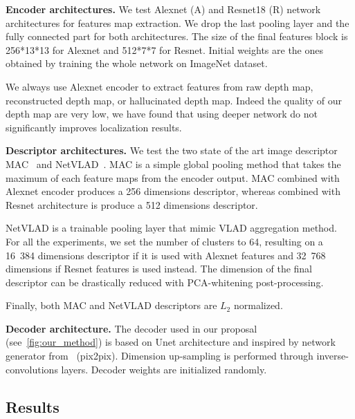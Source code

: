 \noindent\textbf{Encoder architectures.} We test Alexnet (A) and Resnet18 (R) network architectures for features map extraction. We drop the last pooling layer and the fully connected part for both architectures. The size of the final features block is 256*13*13 for Alexnet and 512*7*7 for Resnet. Initial weights are the ones obtained by training the whole network on ImageNet dataset.

We always use Alexnet encoder to extract features from raw depth map, reconstructed depth map, or hallucinated depth map. Indeed the quality of our depth map are very low, we have found that using deeper network do not significantly improves localization results.

\noindent\textbf{Descriptor architectures.} We test the two state of the art image descriptor MAC~\cite{Radenovic2017} and NetVLAD~\cite{Arandjelovic2017}. MAC is a simple global pooling method that takes the maximum of each feature maps from the encoder output. MAC combined with Alexnet encoder produces a 256 dimensions descriptor, whereas combined with Resnet architecture is produce a 512 dimensions descriptor.

NetVLAD is a trainable pooling layer that mimic VLAD aggregation method. For all the experiments, we set the number of clusters to 64, resulting on a 16~384 dimensions descriptor if it is used with Alexnet features and 32~768 dimensions if Resnet features is used instead. The dimension of the final descriptor can be drastically reduced with PCA-whitening post-processing.

Finally, both MAC and NetVLAD descriptors are $L_{2}$ normalized.

\noindent\textbf{Decoder architecture.} The decoder used in our proposal (see~\ref{fig:our_method}) is based on Unet architecture and inspired by network generator from~\cite{} (pix2pix). Dimension up-sampling is performed through inverse-convolutions layers. Decoder weights are initialized randomly.

\subsection{Results}
\label{subsec:results}

